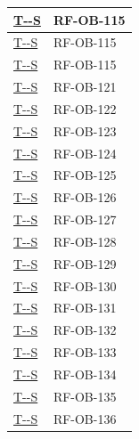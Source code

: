 \documentclass[a4paper,12pt]{article}
\newcounter{testsys}
\newcommand{\systestref}{%
  \hyperlink{T-\arabic{testsys}-S}{T-\arabic{testsys}-S}%
}
\begin{document}
\begin{center}
\begin{longtable}{|>{\centering\arraybackslash}p{5cm}|>{\centering\arraybackslash}p{9cm}|}
\stepcounter{testsys}
\systestref & RF-OB-115 \\
\hline

\stepcounter{testsys}
\systestref & RF-OB-115 \\
\hline

\stepcounter{testsys}
\systestref & RF-OB-115 \\
\hline

\stepcounter{testsys}
\systestref & RF-OB-121 \\
\hline

\stepcounter{testsys}
\systestref & RF-OB-122 \\
\hline

\stepcounter{testsys}
\systestref & RF-OB-123 \\
\hline

\stepcounter{testsys}
\systestref & RF-OB-124 \\
\hline

\stepcounter{testsys}
\systestref & RF-OB-125 \\
\hline

\stepcounter{testsys}
\systestref & RF-OB-126 \\
\hline

\stepcounter{testsys}
\systestref & RF-OB-127 \\
\hline

\stepcounter{testsys}
\systestref & RF-OB-128 \\
\hline

\stepcounter{testsys}
\systestref & RF-OB-129 \\
\hline

\stepcounter{testsys}
\systestref & RF-OB-130 \\
\hline

\stepcounter{testsys}
\systestref & RF-OB-131 \\
\hline

\stepcounter{testsys}
\systestref & RF-OB-132 \\
\hline

\stepcounter{testsys}
\systestref & RF-OB-133 \\
\hline

\stepcounter{testsys}
\systestref & RF-OB-134 \\
\hline

\stepcounter{testsys}
\systestref & RF-OB-135 \\
\hline

\stepcounter{testsys}
\systestref & RF-OB-136 \\
\hline


\end{longtable}
\end{center}
\end{document}
